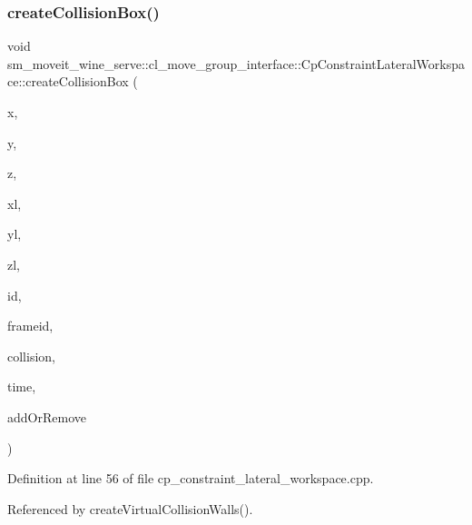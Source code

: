\subsubsection{\texorpdfstring{create\+Collision\+Box()}{createCollisionBox()}}
{\footnotesize\ttfamily void sm\+\_\+moveit\+\_\+wine\+\_\+serve\+::cl\+\_\+move\+\_\+group\+\_\+interface\+::\+Cp\+Constraint\+Lateral\+Workspace\+::create\+Collision\+Box (\begin{DoxyParamCaption}\item[{float}]{x,  }\item[{float}]{y,  }\item[{float}]{z,  }\item[{float}]{xl,  }\item[{float}]{yl,  }\item[{float}]{zl,  }\item[{std\+::string}]{id,  }\item[{std\+::string}]{frameid,  }\item[{moveit\+\_\+msgs\+::\+Collision\+Object \&}]{collision,  }\item[{const ros\+::\+Time \&}]{time,  }\item[{int}]{add\+Or\+Remove }\end{DoxyParamCaption})}



Definition at line 56 of file cp\+\_\+constraint\+\_\+lateral\+\_\+workspace.\+cpp.



Referenced by create\+Virtual\+Collision\+Walls().


